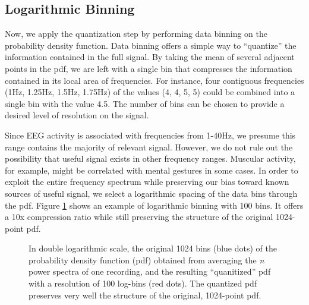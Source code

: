 \subsection{Logarithmic Binning}

Now, we apply the quantization step by performing data binning on the probability density function. Data binning offers a simple way to ``quantize'' the information contained in the full signal. By taking the mean of several adjacent points in the pdf, we are left with a single bin that compresses the information contained in its local area of frequencies. For instance, four contiguous frequencies (1Hz, 1.25Hz, 1.5Hz, 1.75Hz) of the values (4, 4, 5, 5) could be combined into a single bin with the value 4.5. The number of bins can be chosen to provide a desired level of  resolution on the signal.


Since EEG activity is associated with frequencies from 1-40Hz, we presume this range contains the majority of relevant signal. However, we do not rule out the possibility that useful signal exists in other frequency ranges. Muscular activity, for example, might be correlated with mental gestures in some cases. In order to exploit the entire frequency spectrum while preserving our bias toward known sources of useful signal, we select a logarithmic spacing of the data bins through the pdf. Figure \ref{binnedEEGpowerspec} shows an example of logarithmic binning with 100 bins. It offers a 10x compression ratio while still preserving the structure of the original 1024-point pdf.

\begin{figure}[!h]
  \vspace{-0.2cm}
  {}
\caption{In double logarithmic scale, the original 1024 bins (blue dots) of the probability density function (pdf) obtained from averaging the \emph{n} power spectra of one recording, and the resulting ``quanitized''  pdf with a resolution of 100 log-bins (red dots). The quantized pdf preserves very well the structure of the original, 1024-point pdf. }
\label{binnedEEGpowerspec}
\vspace{-0.1cm}
\end{figure}

